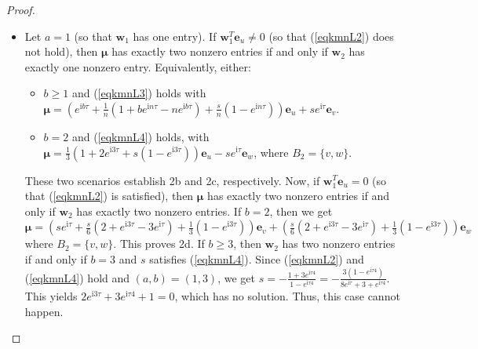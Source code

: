\documentclass{article}
\numberwithin{equation}{section}
\newcommand{\be}{\mathbf e}
\newcommand{\bw}{\mathbf w}
\newcommand{\bmu}{{\boldsymbol{\mu}}}
\def\ii{\mathrm{i}}
\begin{document}
{\begin{proof}
\begin{itemize}
\item Let $a=1$ (so that $\bw_1$ has one entry). If $\bw_1^T\be_u\neq 0$ (so that (\ref{eqkmnL2}) does not hold), then $\bmu$ has exactly two nonzero entries if and only if $\bw_2$ has exactly one nonzero entry. Equivalently, either: 
\begin{itemize}
\item $b\geq 1$ and (\ref{eqkmnL3}) holds with $\bmu=\left(e^{\ii b \tau}+\frac{1}{n}(1+be^{\ii n \tau}-ne^{\ii b \tau})+\frac{s}{n}(1-e^{\ii n \tau})\right)\be_u+se^{\ii \tau }\be_v$.
\item $b=2$ and (\ref{eqkmnL4}) holds, with $\bmu=\frac{1}{3}\left(1+2e^{\ii 3 \tau}+s(1-e^{\ii 3 \tau})\right)\be_u -se^{\ii \tau }\be_w$, where $B_2=\{v,w\}$.
\end{itemize}
These two scenarios establish 2b and 2c, respectively. Now, if $\bw_1^T\be_u=0$ (so that (\ref{eqkmnL2}) is satisfied), then $\bmu$ has exactly two nonzero entries if and only if $\bw_2$ has exactly two nonzero entries. If $b=2$, then we get $\bmu=\left(se^{\ii \tau}+\frac{s}{6}(2+e^{\ii 3 \tau}-3e^{\ii \tau})+\frac{1}{3}(1-e^{\ii 3 \tau})\right)\be_v+\left(\frac{s}{6}(2+e^{\ii 3 \tau}-3e^{\ii \tau})+\frac{1}{3}(1-e^{\ii 3 \tau})\right)\be_w$
where $B_2=\{v,w\}$. This proves 2d.
If $b\geq 3$, then $\bw_2$ has two nonzero entries if and only if $b=3$ and $s$ satisfies (\ref{eqkmnL4}). %
Since (\ref{eqkmnL2}) and (\ref{eqkmnL4}) hold and $(a,b)=(1,3)$, we get $s=-\frac{1+3e^{\ii \tau 4}}{1-e^{\ii \tau 4}}=-\frac{3(1-e^{\ii \tau 4})}{8e^{\ii \tau}+3+e^{\ii \tau 4}}$. This yields $2e^{\ii 3 \tau}+3e^{\ii \tau 4}+1=0$, which has no solution. Thus, this case cannot happen.



\end{itemize}
\end{proof}}
\end{document}
